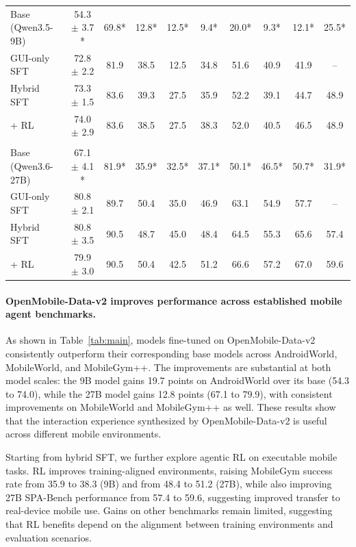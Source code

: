 \begin{table}[h]
{\begin{tabular}{lccccccccc}
Base (Qwen3.5-9B)
  & 54.3 $\pm$ 3.7 *  & 69.8*
  & 12.8* & 12.5*
  & 9.4* & 20.0*
  & 9.3* & 12.1*
  & 25.5* \\
\quad GUI-only SFT
  & 72.8 $\pm$ 2.2 & 81.9
  & 38.5 & 12.5
  & 34.8 & 51.6
  & 40.9 & 41.9
  & -- \\
\quad Hybrid SFT
  & 73.3 $\pm$ 1.5 & 83.6
  & 39.3 & 27.5
  & 35.9 & 52.2
  & 39.1 & 44.7
  & 48.9 \\
\quad+ RL
  & 74.0 $\pm$ 2.9 & 83.6
  & 38.5 & 27.5
  & 38.3 & 52.0
  & 40.5 & 46.5
  & 48.9 \\
\addlinespace
\multicolumn{10}{l}{OpenMobile-2-27B} \\
Base (Qwen3.6-27B)
  & 67.1 $\pm$ 4.1 *& 81.9*
  & 35.9* & 32.5*
  & 37.1* & 50.1*
  & 46.5* & 50.7*
  & 31.9* \\
\quad GUI-only SFT
  & 80.8 $\pm$ 2.1 & 89.7
  & 50.4 & 35.0
  & 46.9 & 63.1
  & 54.9 & 57.7
  & -- \\
\quad Hybrid SFT
  & 80.8 $\pm$ 3.5 & 90.5
  & 48.7 & 45.0
  & 48.4 & 64.5
  & 55.3 & 65.6
  & 57.4 \\
\quad + RL
  & 79.9 $\pm$ 3.0 & 90.5
  & 50.4 & 42.5
  & 51.2 & 66.6
  & 57.2 & 67.0
  & 59.6 \\
\bottomrule
\end{tabular}
}
\end{table}


\paragraph{OpenMobile-Data-v2 improves performance across established mobile agent benchmarks.}
As shown in Table~\ref{tab:main}, models fine-tuned on OpenMobile-Data-v2 consistently outperform their corresponding base models across AndroidWorld, MobileWorld, and MobileGym++. The improvements are substantial at both model scales: the 9B model gains 19.7 points on AndroidWorld over its base (54.3 to 74.0), while the 27B model gains 12.8 points (67.1 to 79.9), with consistent improvements on MobileWorld and MobileGym++ as well. These results show that the interaction experience synthesized by OpenMobile-Data-v2 is useful across different mobile environments.

Starting from hybrid SFT, we further explore agentic RL on executable mobile tasks. 
RL improves training-aligned environments, raising MobileGym success rate from 35.9 to 38.3 (9B) and from 48.4 to 51.2 (27B), while also improving 27B SPA-Bench performance from 57.4 to 59.6, suggesting improved transfer to real-device mobile use. Gains on other benchmarks remain limited, suggesting that RL benefits depend on the alignment between training environments and evaluation scenarios.


